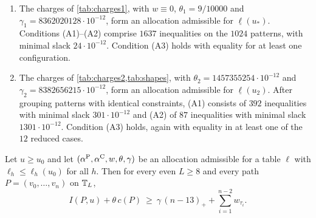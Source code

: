 \begin{certificate}[Allocations]\label{cert:allocation}
\begin{enumerate}[label=\textup{(\alph*)}]
\item The charges of \cref{tab:charges1}, with $w\equiv0$, $\theta_1=9/10000$ and $\gamma_1=8362020128\cdot10^{-12}$, form an allocation admissible for $\underline\ell(u_*)$. Conditions (A1)--(A2) comprise $1637$ inequalities on the $1024$ patterns, with minimal slack $24\cdot10^{-12}$. Condition (A3) holds with equality for at least one configuration.
\item The charges of \cref{tab:charges2,tab:shapes}, with $\theta_2=1457355254\cdot10^{-12}$ and $\gamma_2=8382656215\cdot10^{-12}$, form an allocation admissible for $\underline\ell(u_2)$. After grouping patterns with identical constraints, (A1) consists of $392$ inequalities with minimal slack $301\cdot10^{-12}$ and (A2) of $87$ inequalities with minimal slack $1301\cdot10^{-12}$. Condition (A3) holds, again with equality in at least one of the $12$ reduced cases.
\end{enumerate}
\end{certificate}



\begin{proposition}\label{prop:cost}
Let $u\ge u_0$ and let $(\alpha^{\rm P},\alpha^{\rm C},w,\theta,\gamma)$ be an allocation admissible for a table $\ell$ with $\ell_h\le\ell_h(u_0)$ for all $h$. Then for every even $L\ge8$ and every path $P=(v_0,\dots,v_n)$ on $\mathbb T_L$,
\begin{equation}\label{eq:cost}
 I(P,u)+\theta\,c(P)\ \ge\ \gamma\,(n-13)_+ +\sum_{i=1}^{n-2}w_{\tau_i}.
\end{equation}
\end{proposition}

